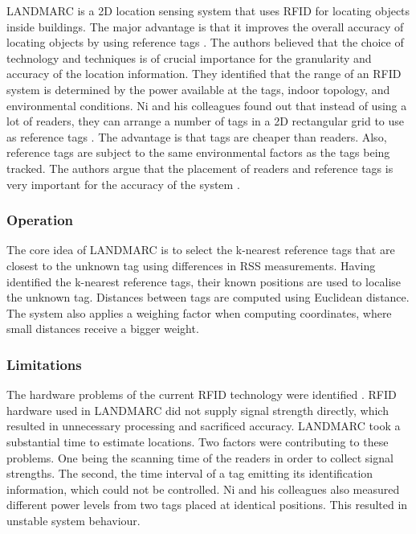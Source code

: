 LANDMARC is a 2D location sensing system that uses RFID for locating objects inside buildings. The major advantage is that it improves the overall accuracy of locating objects by using reference tags \cite{Ni2004}. The authors believed that the choice of technology and techniques is of crucial importance for the granularity and accuracy of the location information. They identified that the range of an RFID system is determined by the power available at the tags, indoor topology, and environmental conditions. Ni and his colleagues found out that instead of using a lot of readers, they can arrange a number of tags in a 2D rectangular grid to use as reference tags \cite{Ni2004}. The advantage is that tags are cheaper than readers. Also, reference tags are subject to the same environmental factors as the tags being tracked. The authors argue that the placement of readers and reference tags is very important for the accuracy of the system \cite{Ni2004}.

\subsubsection{Operation}

The core idea of LANDMARC is to select the k-nearest reference tags that are closest to the unknown tag using differences in RSS measurements. Having identified the k-nearest reference tags, their known positions are used to localise the unknown tag. Distances between tags are computed using Euclidean distance. The system also applies a weighing factor when computing coordinates, where small distances receive a bigger weight.

\subsubsection{Limitations}

The hardware problems of the current RFID technology were identified \cite{Ni2004}. RFID hardware used in LANDMARC did not supply signal strength directly, which resulted in unnecessary processing and sacrificed accuracy. LANDMARC took a substantial time to estimate locations. Two factors were contributing to these problems. One being the scanning time of the readers in order to collect signal strengths. The second, the time interval of a tag emitting its identification information, which could not be controlled. Ni and his colleagues also measured different power levels from two tags placed at identical positions. This resulted in unstable system behaviour.

